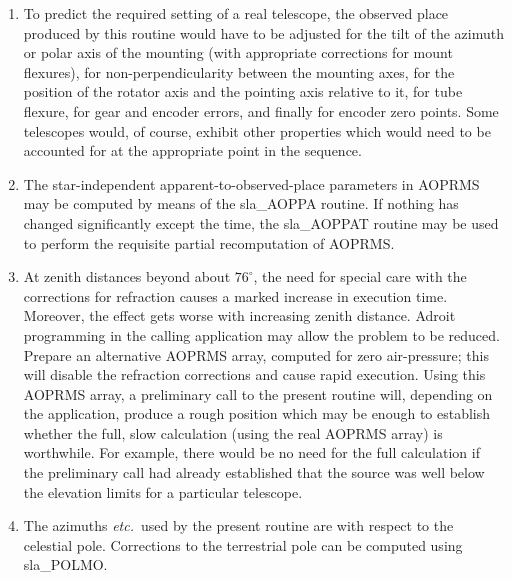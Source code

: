 \documentclass[11pt,twoside]{article}
\begin{document}
{\begin{enumerate}
        equatorial located at the observer and with its polar axis
        aligned to the Earth's axis of rotation ({\it n.b.}\ not to the
        refracted pole).  Finally, the $\alpha$ is obtained by subtracting
        the {\it h}\/ from the local apparent ST.
  \item To predict the required setting of a real telescope, the
        observed place produced by this routine would have to be
        adjusted for the tilt of the azimuth or polar axis of the
        mounting (with appropriate corrections for mount flexures),
        for non-perpendicularity between the mounting axes, for the
        position of the rotator axis and the pointing axis relative
        to it, for tube flexure, for gear and encoder errors, and
        finally for encoder zero points.  Some telescopes would, of
        course, exhibit other properties which would need to be
        accounted for at the appropriate point in the sequence.
  \item The star-independent apparent-to-observed-place parameters
        in AOPRMS may be computed by means of the sla\_AOPPA routine.
        If nothing has changed significantly except the time, the
        sla\_AOPPAT routine may be used to perform the requisite
        partial recomputation of AOPRMS.
  \item At zenith distances beyond about $76^\circ$, the need for
        special care with the corrections for refraction causes a
        marked increase in execution time.  Moreover, the effect
        gets worse with increasing zenith distance.  Adroit
        programming in the calling application may allow the
        problem to be reduced.  Prepare an alternative AOPRMS array,
        computed for zero air-pressure;  this will disable the
        refraction corrections and cause rapid execution.  Using
        this AOPRMS array, a preliminary call to the present routine
        will, depending on the application, produce a rough position
        which may be enough to establish whether the full, slow
        calculation (using the real AOPRMS array) is worthwhile.
        For example, there would be no need for the full calculation
        if the preliminary call had already established that the
        source was well below the elevation limits for a particular
        telescope.
  \item The azimuths {\it etc.}\ used by the present routine are with
        respect to the celestial pole.  Corrections to the terrestrial pole
        can be computed using sla\_POLMO.
 \end{enumerate}
}
\end{document}
